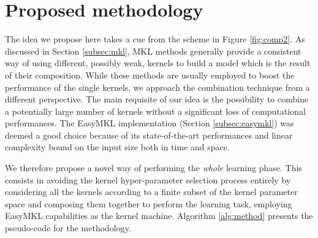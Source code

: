 \section{Proposed methodology}
\label{sec:method}
The idea we propose here takes a cue from the scheme in Figure \ref{fig:comp2}.
As discussed in Section \ref{subsec:mkl}, MKL methods generally provide a consistent
way of using different, possibly weak, kernels to build a model which is the result
of their composition.
While these methods are usually employed to boost the performance of the single
kernels, we approach the combination technique from a different perspective.
The main requisite of our idea is the possibility to combine a potentially
large number of kernels without a significant loss of computational performances.
The EasyMKL implementation (Section \ref{subsec:easymkl}) was deemed a good
choice because of its state-of-the-art performances and linear complexity
bound on the input size both in time and space.

We therefore propose a novel way of performing the \emph{whole} learning phase.
This consists in avoiding the kernel hyper-parameter selection process entirely by considering
all the kernels according to a finite subset of the kernel parameter space and composing
them together to perform the learning task, employing EasyMKL capabilities as the kernel
machine.
Algorithm \ref{alg:method} presents the pseudo-code for the methodology.


